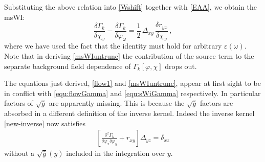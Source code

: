 \documentclass[11pt]{book} %
\numberwithin{equation}{chapter}
\begin{document}
Substituting the above relation into \eqref{Wshift} together with \eqref{EAA}, we obtain the msWI:
\begin{equation}
	\label{msWIuntrunc}
	\frac{\delta \Gamma_k}{\delta\chi_\omega}-\frac{\delta \Gamma_k}{\delta\varphi_\omega}=
	\frac{1}{2} \, \Delta_{xy}\,\frac{\delta r_{yx}}{\delta\chi_\omega} \,,
\end{equation}
where we have used the fact that the identity must hold for arbitrary $\varepsilon(\omega)$.
Note that in deriving \eqref{msWIuntrunc} the contribution of the source term to the separate background
field dependence of $\Gamma_k[\varphi,\chi]$ drops out.

The equations just derived, \eqref{flow1} and \eqref{msWIuntrunc},
appear at first sight to be in conflict with \eqref{equ:flowGamma} and \eqref{equ:sWiGamma} respectively.
In particular  factors of $\sqrt{\bar g}$ are apparently missing. This is because the $\sqrt{\bar g}$ factors
are absorbed in a different definition of the inverse kernel.
Indeed the inverse kernel \eqref{new-inverse} now satisfies
\begin{align}
  \left[
    \frac{\delta^{2}\Gamma_k}{\delta\varphi_x \delta\varphi_y}+r_{xy}
  \right] \Delta_{yz} =\delta_{xz}
\end{align}
without a $\sqrt{\bar g}(y)$  included in the integration over $y$.
\end{document}
